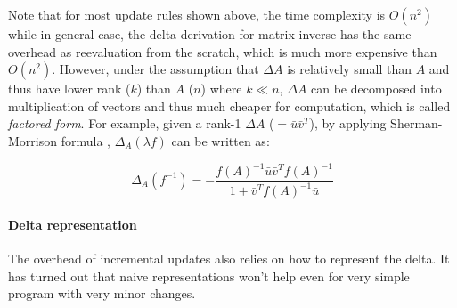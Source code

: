 Note that for most update rules shown above, the time complexity is $O(n^2)$ while in general case, the delta derivation for matrix inverse has the same overhead as reevaluation from the scratch, which is much more expensive than $O(n^2)$. However, under the assumption that $\Delta A$ is relatively small than $A$ and thus have lower rank ($k$) than $A$ ($n$) where $k \ll n$, $\Delta A$ can be decomposed into multiplication of vectors and thus much cheaper for computation, which is called {\em factored form}. For example, given a rank-1 $\Delta A$ ($=\bar{u}\bar{v}^T$), by applying Sherman-Morrison formula \cite{press2007numerical}, $\Delta_A(\lambda f)$ can be written as:

\begin{equation}\label{eq: matrix_inverse}
\Delta_A(f^{-1}) = -\frac{f(A)^{-1}\bar{u}\bar{v}^Tf(A)^{-1}}{1+\bar{v}^Tf(A)^{-1}\bar{u}}
\end{equation}

\paragraph{Delta representation}
The overhead of incremental updates also relies on how to represent the delta. It has turned out that naive representations won't help even for very simple program with very minor changes. 

